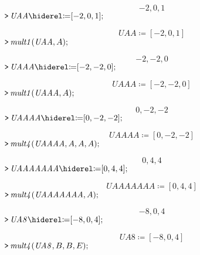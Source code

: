 \documentclass{article}
\begin{document}
\begin{dmath}\label{(19)}
-2,0,1
\end{dmath}
\mapleinput
{$ \displaystyle \texttt{>\,} \mathit{UAA} \coloneqq [-2,0,1]; $}

\begin{dmath}\label{(20)}
\mathit{UAA} \coloneqq \left[-2,0,1\right]
\end{dmath}
\mapleinput
{$ \displaystyle \texttt{>\,} \mathit{mult1} (\mathit{UAA} ,A); $}

\begin{dmath}\label{(21)}
-2,-2,0
\end{dmath}
\mapleinput
{$ \displaystyle \texttt{>\,} \mathit{UAAA} \coloneqq [-2,-2,0]; $}

\begin{dmath}\label{(22)}
\mathit{UAAA} \coloneqq \left[-2,-2,0\right]
\end{dmath}
\mapleinput
{$ \displaystyle \texttt{>\,} \mathit{mult1} (\mathit{UAAA} ,A); $}

\begin{dmath}\label{(23)}
0,-2,-2
\end{dmath}
\mapleinput
{$ \displaystyle \texttt{>\,} \mathit{UAAAA} \coloneqq [0,-2,-2]; $}

\begin{dmath}\label{(24)}
\mathit{UAAAA} \coloneqq \left[0,-2,-2\right]
\end{dmath}
\mapleinput
{$ \displaystyle \texttt{>\,} \mathit{mult4} (\mathit{UAAAA} ,A ,A ,A); $}

\begin{dmath}\label{(25)}
0,4,4
\end{dmath}
\mapleinput
{$ \displaystyle \texttt{>\,} \mathit{UAAAAAAA} \coloneqq [0,4,4]; $}

\begin{dmath}\label{(26)}
\mathit{UAAAAAAA} \coloneqq \left[0,4,4\right]
\end{dmath}
\mapleinput
{$ \displaystyle \texttt{>\,} \mathit{mult4} (\mathit{UAAAAAAA} ,A); $}

\begin{dmath}\label{(27)}
-8,0,4
\end{dmath}
\mapleinput
{$ \displaystyle \texttt{>\,} \mathit{UA8} \coloneqq [-8,0,4]; $}

\begin{dmath}\label{(28)}
\mathit{UA8} \coloneqq \left[-8,0,4\right]
\end{dmath}
\mapleinput
{$ \displaystyle \texttt{>\,} \mathit{mult4} (\mathit{UA8} ,B ,B ,E); $}
\end{document}
